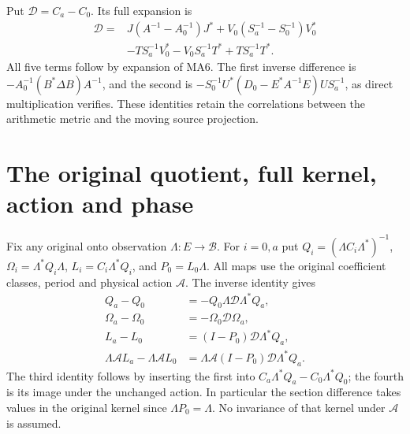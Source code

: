 \documentclass[11pt]{article}
\begin{document}
Put $\mathcal D=C_a-C_0$. Its full expansion is
\begin{equation}\tag{MA7}\boxed{\begin{aligned}
\mathcal D={}&J(A^{-1}-A_0^{-1})J^*
 +V_0(S_a^{-1}-S_0^{-1})V_0^*\\
 &-TS_a^{-1}V_0^*-V_0S_a^{-1}T^*
 +TS_a^{-1}T^*.
\end{aligned}}\end{equation}
All five terms follow by expansion of MA6. The first inverse difference
is $-A_0^{-1}(B^*\Delta B)A^{-1}$, and the second is
$-S_0^{-1}U^*(D_0-E^*A^{-1}E)US_a^{-1}$, as direct
multiplication verifies. These identities retain the correlations
between the arithmetic metric and the moving source projection.

\section{The original quotient, full kernel, action and phase}
Fix any original onto observation $\Lambda:E\to\mathcal B$.
For $i=0,a$ put
$Q_i=(\Lambda C_i\Lambda^*)^{-1}$,
$\Omega_i=\Lambda^*Q_i\Lambda$,
$L_i=C_i\Lambda^*Q_i$, and $P_0=L_0\Lambda$.
All maps use the original coefficient classes, period and physical
action $\mathcal A$. The inverse identity gives
\begin{equation}\tag{MA8}\boxed{\begin{aligned}
 Q_a-Q_0&=-Q_0\Lambda\mathcal D\Lambda^*Q_a,\\
 \Omega_a-\Omega_0&=-\Omega_0\mathcal D\Omega_a,\\
 L_a-L_0&=(I-P_0)\mathcal D\Lambda^*Q_a,\\
 \Lambda\mathcal A L_a-\Lambda\mathcal A L_0
 &=\Lambda\mathcal A(I-P_0)\mathcal D\Lambda^*Q_a.
\end{aligned}}\end{equation}
The third identity follows by inserting the first into
$C_a\Lambda^*Q_a-C_0\Lambda^*Q_0$; the fourth is its image under
the unchanged action. In particular the section difference takes
values in the original kernel since $\Lambda P_0=\Lambda$.
No invariance of that kernel under $\mathcal A$ is assumed.
\end{document}

